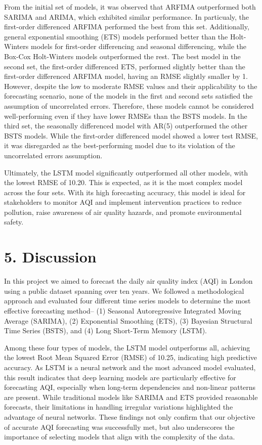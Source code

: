 \documentclass[
  12pt,
]{article}
\begin{document}
From the initial set of models, it was observed that ARFIMA outperformed
both SARIMA and ARIMA, which exhibited similar performance. In
particualy, the first-order differenced ARFIMA performed the best from
this set. Additionally, general exponential smoothing (ETS) models
performed better than the Holt-Winters models for first-order
differencing and seasonal differencing, while the Box-Cox Holt-Winters
models outperformed the rest. The best model in the second set, the
first-order differenced ETS, performed slightly better than the
first-order differenced ARFIMA model, having an RMSE slightly smaller by
1. However, despite the low to moderate RMSE values and their
applicability to the forecasting scenario, none of the models in the
first and second sets satisfied the assumption of uncorrelated errors.
Therefore, these models cannot be considered well-performing even if
they have lower RMSEs than the BSTS models. In the third set, the
seasonally differenced model with AR(5) outperformed the other BSTS
models. While the first-order differenced model showed a lower test
RMSE, it was disregarded as the best-performing model due to its
violation of the uncorrelated errors assumption.

Ultimately, the LSTM model significantly outperformed all other models,
with the lowest RMSE of 10.20. This is expected, as it is the most
complex model across the four sets. With its high forecasting accuracy,
this model is ideal for stakeholders to monitor AQI and implement
intervention practices to reduce pollution, raise awareness of air
quality hazards, and promote environmental safety.

\section{5. Discussion}\label{discussion}

In this project we aimed to forecast the daily air quality index (AQI)
in London using a public dataset spanning over ten years. We followed a
methodological approach and evaluated four different time series models
to determine the most effective forecasting method-- (1) Seasonal
Autoregressive Integrated Moving Average (SARIMA), (2) Exponential
Smoothing (ETS), (3) Bayesian Structural Time Series (BSTS), and (4)
Long Short-Term Memory (LSTM).

Among these four types of models, the LSTM model outperforms all,
achieving the lowest Root Mean Squared Error (RMSE) of 10.25, indicating
high predictive accuracy. As LSTM is a neural network and the most
advanced model evaluated, this result indicates that deep learning
models are particularly effective for forecasting AQI, especially when
long-term dependencies and non-linear patterns are present. While
traditional models like SARIMA and ETS provided reasonable forecasts,
their limitations in handling irregular variations highlighted the
advantage of neural networks. These findings not only confirm that our
objective of accurate AQI forecasting was successfully met, but also
underscores the importance of selecting models that align with the
complexity of the data.
\end{document}
